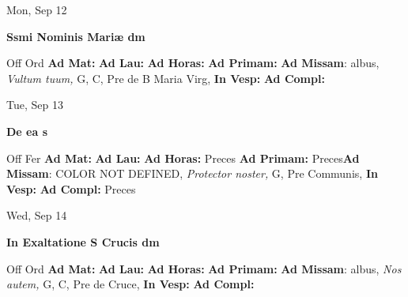 \documentclass[10pt]{book}
\begin{document}
\begin{center}
\begin{minipage}{3.5in}
\vspace{2em}
\begin{center}Mon, Sep 12
\end{center}
\textbf{ \large Ssmi Nominis Mariæ
\textnormal{\normalsize dm}}

\begin{justify}Off Ord
\textbf{Ad Mat: }
\textbf{Ad Lau: }
\textbf{Ad Horas: }
\textbf{Ad Primam: }\textbf{Ad Missam}: albus, \textit{Vultum tuum,} G, C, Pre de B Maria Virg, 
\textbf{In Vesp: }
\textbf{Ad Compl: }
\end{justify}
\end{minipage}
\end{center}

\begin{center}
\begin{minipage}{3.5in}
\vspace{2em}
\begin{center}Tue, Sep 13
\end{center}
\textbf{ \large De ea
\textnormal{\normalsize s}}

\begin{justify}Off Fer
\textbf{Ad Mat: }
\textbf{Ad Lau: }
\textbf{Ad Horas: }Preces
\textbf{Ad Primam: }Preces\textbf{Ad Missam}: COLOR NOT DEFINED, \textit{Protector noster,} G, Pre Communis, 
\textbf{In Vesp: }
\textbf{Ad Compl: }Preces
\end{justify}
\end{minipage}
\end{center}

\begin{center}
\begin{minipage}{3.5in}
\vspace{2em}
\begin{center}Wed, Sep 14
\end{center}
\textbf{ \large In Exaltatione S Crucis
\textnormal{\normalsize dm}}

\begin{justify}Off Ord
\textbf{Ad Mat: }
\textbf{Ad Lau: }
\textbf{Ad Horas: }
\textbf{Ad Primam: }\textbf{Ad Missam}: albus, \textit{Nos autem,} G, C, Pre de Cruce, 
\textbf{In Vesp: }
\textbf{Ad Compl: }
\end{justify}
\end{minipage}
\end{center}
\end{document}
